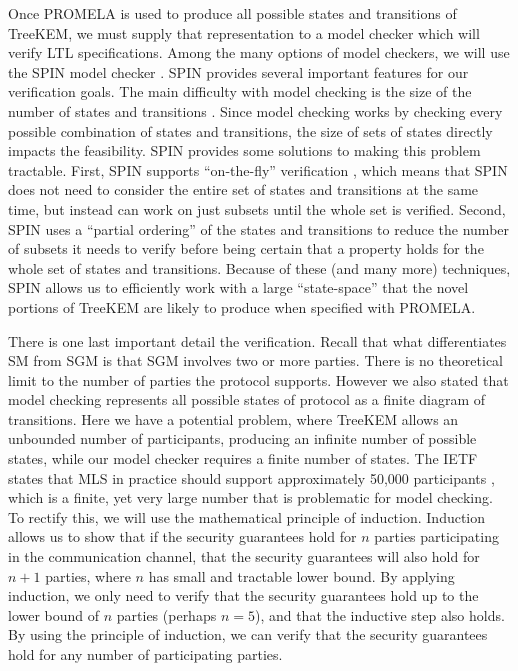 \documentclass[12pt,twocolumn]{article}
\begin{document}
	Once PROMELA is used to produce all possible states and transitions of TreeKEM, we must supply that representation to a model checker which will verify LTL specifications. Among the many options of model checkers, we will use the SPIN model checker \cite{holzmann1997model}. SPIN provides several important features for our verification goals. The main difficulty with model checking is the size of the number of states and transitions \cite{burch1992symbolic}. Since model checking works by checking every possible combination of states and transitions, the size of sets of states directly impacts the feasibility. SPIN provides some solutions to making this problem tractable. First, SPIN supports ``on-the-fly'' verification \cite{couvreur1999fly}, which means that SPIN does not need to consider the entire set of states and transitions at the same time, but instead can work on just subsets until the whole set is verified. Second, SPIN uses a ``partial ordering'' of the states and transitions \cite{godefroid1990using} to reduce the number of subsets it needs to verify before being certain that a property holds for the whole set of states and transitions. Because of these (and many more) techniques, SPIN allows us to efficiently work with a large ``state-space'' that the novel portions of TreeKEM are likely to produce when specified with PROMELA.
	
	There is one last important detail the verification. Recall that what differentiates SM from SGM is that SGM involves two or more parties. There is no theoretical limit to the number of parties the protocol supports. However we also stated that model checking represents all possible states of protocol as a finite diagram of transitions. Here we have a potential problem, where TreeKEM allows an unbounded number of participants, producing an infinite number of possible states, while our model checker requires a finite number of states. The IETF states that MLS in practice should support approximately 50,000 participants \cite{Omara2020}, which is a finite, yet very large number that is problematic for model checking. To rectify this, we will use the mathematical principle of induction. Induction allows us to show that if the security guarantees hold for $n$ parties participating in the communication channel, that the security guarantees will also hold for $n+1$ parties, where $n$ has small and tractable lower bound. By applying induction, we only need to verify that the security guarantees hold up to the lower bound of $n$ parties (perhaps $n=5$), and that the inductive step also holds. By using the principle of induction, we can verify that the security guarantees hold for any number of participating parties.
	
\end{document}
